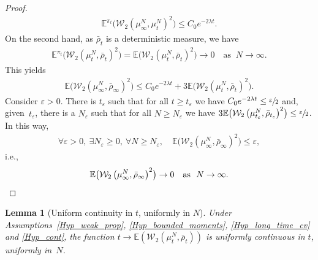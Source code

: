 \documentclass[11pt]{article}
\newcommand{\ie}{i.e.,\xspace}
\let\epsilon\varepsilon
\theoremstyle{plain}
\newtheorem{lemma}{Lemma}[section]
\theoremstyle{definition}
\begin{document}
\begin{proof}
\begin{align*}
\mathbb{E}^{\pi_t}\bigl(\mathcal{W}_2\left(\mu^N_{\infty},\mu^N_{t}\right)^2\bigr)\leq C_0e^{-2\lambda t}.
\end{align*}
On the second hand, as $\bar{\rho}_{t}$ is a deterministic measure, we have
\begin{align*}
\mathbb{E}^{\pi_t}\bigl(\mathcal{W}_2\left(\mu^N_{t},\bar{\rho}_{t}\right)^2\bigr)=\mathbb{E}\bigl(\mathcal{W}_2\left(\mu^N_{t},\bar{\rho}_{t}\right)^2\bigr)\to 0\quad\text{as }\ N\to\infty.
\end{align*}
This yields
\begin{align*}
\mathbb{E}\bigl(\mathcal{W}_2\left(\mu^N_{\infty},\bar{\rho}_{\infty}\right)^2\bigr)\leq C_0e^{-2\lambda t}+3\mathbb{E}\bigl(\mathcal{W}_2\left(\mu^N_{t},\bar{\rho}_{t}\right)^2\bigr).
\end{align*}
Consider $\epsilon>0$. There is $t_\epsilon$ such that for all $t\geq t_\epsilon$ we have $C_0e^{-2\lambda t}\leq\sfrac{\epsilon}{2}$ and, given~$t_\epsilon$, there is a $N_\epsilon$ such that for all $N\geq N_\epsilon$ we have ${3\mathbb{E}\bigl(\mathcal{W}_2\left(\mu^{N}_{t_\epsilon},\bar{\rho}_{t_\epsilon} \right)^2 \bigr)\leq\sfrac{\epsilon}{2}}$. In this way,
\begin{align*}
\forall \epsilon >0,\ \exists N_\epsilon \geq0,\ \forall N\geq N_\epsilon,\quad \mathbb{E}\bigl(\mathcal{W}_2\left(\mu^N_{\infty},\bar{\rho}_{\infty} \right)^2 \bigr)\leq\epsilon,
\end{align*}
\ie
\[
\mathbb{E}\bigl(\mathcal{W}_2\left(\mu^N_{\infty},\bar{\rho}_{\infty}\right)^2\bigr)\to 0\quad\text{as }\ N\to\infty.\qedhere
\]
\end{proof}

\begin{lemma}[Uniform continuity in $t$, uniformly in $N$]\label{cont_unif}
Under Assumptions~\ref{Hyp_weak_prop}, \ref{Hyp_bounded_moments}, \ref{Hyp_long_time_cv} and \ref{Hyp_cont}, the function $t\!\to\!\mathbb{E}\left(\mathcal{W}_2\left(\mu^N_{t},\bar{\rho}_{t}\right)\right)$ is uniformly continuous in $t$, uniformly in~$N$.
\end{lemma}
\end{document}
